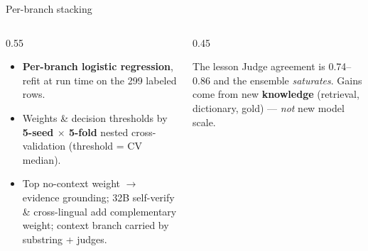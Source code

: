 \documentclass[aspectratio=169,11pt,t]{beamer}
\newcommand{\metric}[1]{{\color{primary}\bfseries #1}}
\begin{document}
\begin{frame}{Per-branch stacking}
  \begin{columns}[T]
    \begin{column}{0.55\textwidth}
      \begin{itemize}
        \item \textbf{Per-branch logistic regression}, refit at run time on the 299 labeled rows.
        \item Weights \& decision thresholds by \metric{5-seed $\times$ 5-fold} nested cross-validation (threshold = CV median).
        \item Top no-context weight $\to$ evidence grounding; 32B self-verify \& cross-lingual add complementary weight; context branch carried by substring + judges.
      \end{itemize}
    \end{column}
    \begin{column}{0.45\textwidth}
      \begin{block}{The lesson}
        Judge agreement is 0.74–0.86 and the ensemble \emph{saturates}. Gains come from new \textbf{knowledge} (retrieval, dictionary, gold) — \emph{not} new model scale.
      \end{block}
    \end{column}
  \end{columns}
\end{frame}
\end{document}
